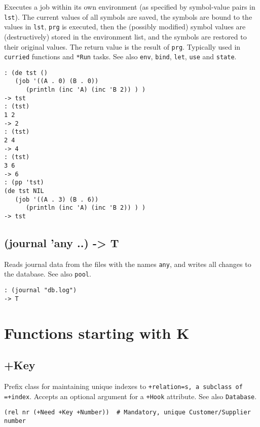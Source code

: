 {{{{{{Executes a job within its own environment (as specified by symbol-value
pairs in \texttt{lst}). The current values of all symbols are saved, the
symbols are bound to the values in \texttt{lst}, \texttt{prg} is executed, then the
(possibly modified) symbol values are (destructively) stored in the
environment list, and the symbols are restored to their original values.
The return value is the result of \texttt{prg}. Typically used in \texttt{curried}
functions and \texttt{*Run} tasks. See also \texttt{env}, \texttt{bind}, \texttt{let}, \texttt{use} and
\texttt{state}.


\begin{verbatim}
: (de tst ()
   (job '((A . 0) (B . 0))
      (println (inc 'A) (inc 'B 2)) ) )
-> tst
: (tst)
1 2
-> 2
: (tst)
2 4
-> 4
: (tst)
3 6
-> 6
: (pp 'tst)
(de tst NIL
   (job '((A . 3) (B . 6))
      (println (inc 'A) (inc 'B 2)) ) )
-> tst
\end{verbatim}

 
\section{(journal 'any ..) -> T}
\label{sec-8-1-10-3}


Reads journal data from the files with the names \texttt{any}, and writes all
changes to the database. See also \texttt{pool}.


\begin{verbatim}
: (journal "db.log")
-> T
\end{verbatim}


\chapter{Functions starting with K}
\label{sec-8-1-11}


 
\section{+Key}
\label{sec-8-1-11-1}


Prefix class for maintaining unique indexes to \texttt{+relation=s, a subclass of =+index}. Accepts an optional argument for a \texttt{+Hook} attribute. See
also \texttt{Database}.


\begin{verbatim}
(rel nr (+Need +Key +Number))  # Mandatory, unique Customer/Supplier number
\end{verbatim}

}}}}}}
